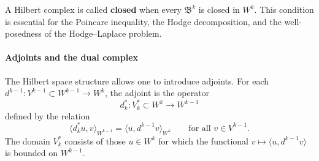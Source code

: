 \documentclass{article}
\DeclareMathOperator{\grad}{grad}
\DeclareMathOperator{\curl}{curl}
\DeclareMathOperator{\divergence}{div}
\newcommand{\f}[1]{\mathfrak{#1}}
\newcommand{\keyterm}[2][]{\textbf{#2}}
\begin{document}


A Hilbert complex is called \keyterm{closed} when every $\f B^k$ is closed in
$W^k$.  This condition is essential for the Poincare inequality, the Hodge
decomposition, and the well-posedness of the Hodge--Laplace problem.


\paragraph{Adjoints and the dual complex}

The Hilbert space structure allows one to introduce adjoints.  For each
$d^{k-1}:V^{k-1}\subset W^{k-1}\to W^k$, the adjoint is the operator
\[
	d_k^* : V_k^* \subset W^k \longrightarrow W^{k-1}
\]
defined by the relation
\[
	\langle d_k^* u,v\rangle_{W^{k-1}}
	=
	\langle u,d^{k-1}v\rangle_{W^k}
	\qquad
	\text{for all } v\in V^{k-1}.
\]
The domain $V_k^*$ consists of those $u\in W^k$ for which the functional
$v\mapsto \langle u,d^{k-1}v\rangle$ is bounded on $W^{k-1}$.
\end{document}

